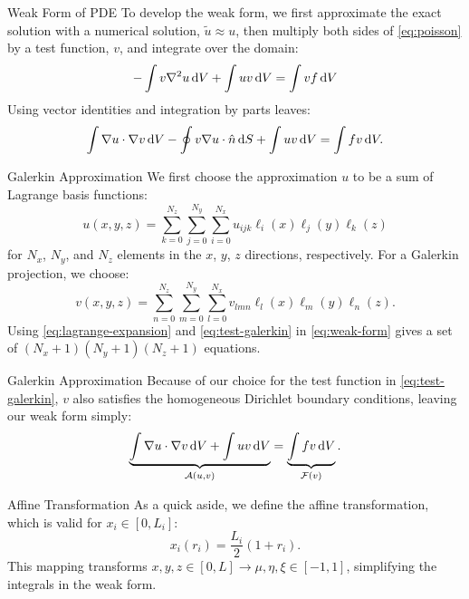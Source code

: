 \begin{frame}{Weak Form of PDE}
  To develop the weak form, we first approximate the exact solution with a numerical solution, $\tilde{u}\approx u$, then multiply both sides of \cref{eq:poisson} by a test function, $v$, and integrate over the domain:
  \begin{equation}
    -\int v\nabla^2 u\odif{V}+ \int uv\odif{V}= \int vf\odif{V}
  \end{equation}
  Using vector identities and integration by parts leaves:
  \begin{equation}
    \int \nabla u\cdot\nabla v\odif{V}-\oint v\nabla u\cdot\hat{n}\odif{S}+\int uv\odif{V}=\int fv\odif{V}.
  \end{equation}
\end{frame}

\begin{frame}{Galerkin Approximation}
  We first choose the approximation $u$ to be a sum of Lagrange basis functions:
  \begin{equation}
    \label{eq:lagrange-expansion}
    u(x,y,z)=\sum_{k=0}^{N_z}\sum_{j=0}^{N_y}\sum_{i=0}^{N_x}u_{ijk}\ell_i(x)\ell_j(y)\ell_k(z)
  \end{equation}
  for $N_x$, $N_y$, and $N_z$ elements in the $x$, $y$, $z$ directions, respectively.
  For a Galerkin projection, we choose:
  \begin{equation}
    \label{eq:test-galerkin}
    v(x,y,z)=\sum_{n=0}^{N_z}\sum_{m=0}^{N_y}\sum_{l=0}^{N_x}v_{lmn}\ell_l(x)\ell_m(y)\ell_n(z).
  \end{equation}
  Using \cref{eq:lagrange-expansion} and \cref{eq:test-galerkin} in \cref{eq:weak-form} gives a set of $(N_x+1)(N_y+1)(N_z+1)$ equations.
\end{frame}

\begin{frame}{Galerkin Approximation}
  Because of our choice for the test function in \cref{eq:test-galerkin}, $v$ also satisfies the homogeneous Dirichlet boundary conditions, leaving our weak form simply:
  \begin{equation}
    \label{eq:weak-form}
	  \underbrace{\int \nabla u\cdot\nabla v\odif{V}+ \int uv\odif{V}}_{\mathcal{A}\left(u,v\right)}=\underbrace{\int fv\odif{V}}_{\mathcal{F}(v)}.
  \end{equation}

\end{frame}

\begin{frame}{Affine Transformation}
  As a quick aside, we define the affine transformation, which is valid for $x_i\in [0,L_i]$:
  \begin{equation}
    \label{eq:affine-trans}
    x_i (r_i)=\frac{L_i}{2}\left(1+r_i\right).
  \end{equation}
  This mapping transforms $x,y,z\in [0,L] \rightarrow \mu,\eta,\xi\in [-1,1]$, simplifying the integrals in the weak form.
\end{frame}

